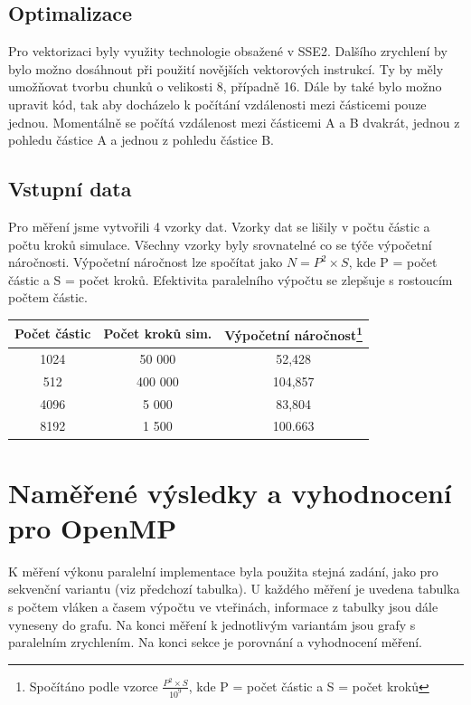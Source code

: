 \documentclass[12pt]{article}
\begin{document}
\subsection{Optimalizace}

Pro vektorizaci byly využity technologie obsažené v SSE2. Dalšího zrychlení by bylo možno dosáhnout při použití novějších vektorových instrukcí.
Ty by měly umožňovat tvorbu chunků o velikosti 8, případně 16.
Dále by také bylo možno upravit kód, tak aby docházelo k počítání vzdálenosti mezi částicemi pouze jednou.
Momentálně se počítá vzdálenost mezi částicemi A a B dvakrát, jednou z pohledu částice A a jednou z pohledu částice B.

\subsection{Vstupní data}
Pro měření jsme vytvořili 4 vzorky dat. Vzorky dat se lišily v počtu částic a počtu kroků simulace.
Všechny vzorky byly srovnatelné co se týče výpočetní náročnosti. Výpočetní náročnost lze spočítat jako ${N = P^2 \times S}$, kde P = počet částic a S = počet kroků.
Efektivita paralelního výpočtu se zlepšuje s rostoucím počtem částic.

\begin{center}
\begin{tabular}{c | c | c }
\textbf{Počet částic} & \textbf{Počet kroků sim.}  & \textbf{Výpočetní náročnost}\footnote{Spočítáno podle vzorce ${\frac{P^2 \times S}{10^9}}$, kde P = počet částic a S = počet kroků} \\ \hline \hline
1024 & 50 000 & 52,428 \\ \hline
512 & 400 000 & 104,857 \\ \hline
4096 & 5 000 & 83,804 \\ \hline
8192 & 1 500 & 100.663 \\ \hline
\end{tabular}
\end{center}

\section{Naměřené výsledky a vyhod\-noce\-ní pro O\-pen\-MP}
K měření výkonu paralelní implementace byla použita stejná zadání, jako pro sekvenční variantu (viz předchozí tabulka).
U každého měření je uvedena tabulka s počtem vláken a časem výpočtu ve vteřinách, informace z tabulky jsou dále vyneseny do grafu.
Na konci měření k jednotlivým variantám jsou grafy s paralelním zrychlením.
Na konci sekce je porovnání a vyhodnocení měření.
\end{document}
